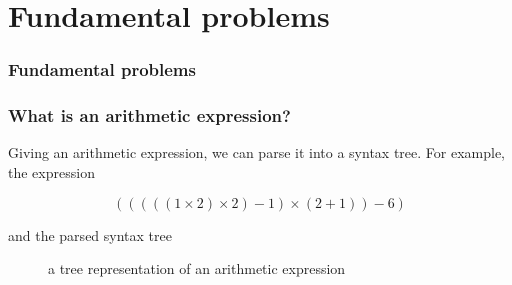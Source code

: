 \documentclass[aspectratio=169]{beamer}
\begin{document}
\section{Fundamental problems}

\begin{frame}
\frametitle{Fundamental problems}
\begin{figure}[ht]\centering
{}
\end{figure}
\end{frame}

\begin{frame}
\frametitle{What is an arithmetic expression?}

Giving an arithmetic expression, we can parse it into a syntax tree. For example, the expression

\begin{equation}
(((((1 \times 2) \times 2) - 1) \times (2 + 1)) - 6)\label{eq:equation}
\end{equation}

and the parsed syntax tree

\begin{figure}[ht]
\centering
{}
\caption{a tree representation of an arithmetic expression}\label{fig:syntaxtree}\label{fig:figure}
\end{figure}
\end{frame}
\end{document}
